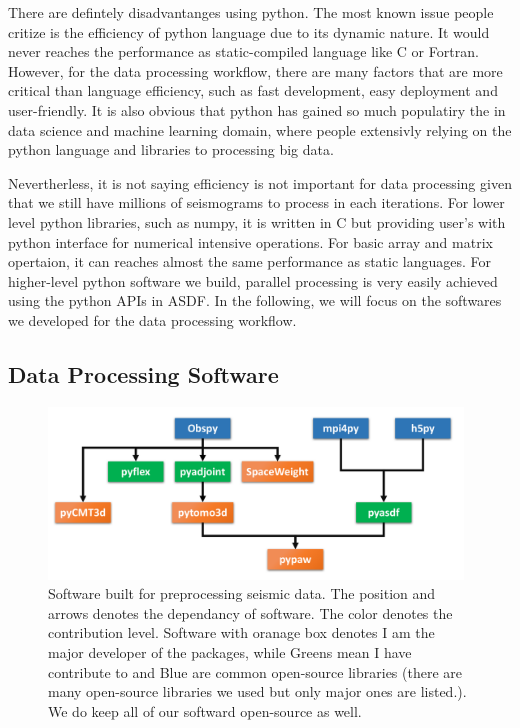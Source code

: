 There are defintely disadvantanges using python. The most known issue people critize is the
efficiency of python language due to its dynamic nature.
It would never reaches the performance
as static-compiled language like C or Fortran. However, for the data processing workflow,
there are many factors that are more critical than language efficiency, such as fast
development, easy deployment and user-friendly. It is also obvious that python
has gained so much populatiry the in data science and machine learning domain, where
people extensivly relying on the python language and libraries to processing big data.

Nevertherless, it is not saying efficiency is not important for data processing
given that we still have millions of seismograms to process in each iterations.
For lower level python libraries, such as numpy, it is written in C but
providing user's with python interface for numerical intensive operations.
For basic array and matrix opertaion, it can reaches
almost the same performance as static languages. For higher-level python software
we build, parallel processing is very easily achieved using the python APIs in ASDF.
In the following, we will focus on the softwares we developed
 for the data processing workflow.

\subsection{Data Processing Software}

\begin{figure}
  \centering
  \includegraphics[width=0.98\textwidth]{ch-tools/figures/data_processing_software.pdf}
  \caption[software built for preprocessing seismic data]
  {\small{Software built for preprocessing seismic data. The position and arrows denotes
  the dependancy of software. The color denotes the contribution level. Software with
  oranage box denotes I am the major developer of the packages, while Greens mean I have
  contribute to and Blue are common open-source libraries (there are many open-source
  libraries we used but only major ones are listed.). We do keep all of our softward
  open-source as well.}}
  \label{fig:preprocess_software}
\end{figure}


